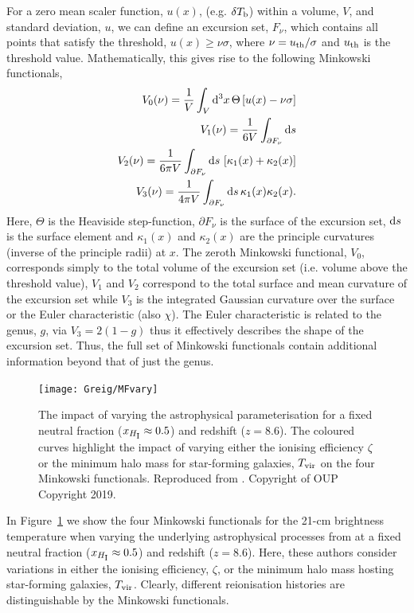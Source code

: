 For a zero mean scaler function, $u(x)$, (e.g. $\delta T_{\rm b}$) within a volume, $V$, and standard deviation, $u$, we can define an excursion set, $F_{\nu}$, which contains all points that satisfy the threshold, $u(x) \geq \nu\sigma$, where $\nu = u_{\rm th}/\sigma$ and $u_{\rm th}$ is the threshold value. Mathematically, this gives rise to the following Minkowski functionals,
\begin{eqnarray}
V_{0}(\nu) = \frac{1}{V}\int_{V} {\rm d^3}x\,\Theta\left[u(x) - \nu \sigma\right] \\
V_{1}(\nu) = \frac{1}{6V}\int_{\partial F_{\nu}} {\rm d}s \\
V_{2}(\nu) = \frac{1}{6\pi V}\int_{\partial F_{\nu}} {\rm d}s\,\left[\kappa_{1}(x) + \kappa_{2}(x)\right] \\
V_{3}(\nu) = \frac{1}{4\pi V}\int_{\partial F_{\nu}} {\rm d}s\, \kappa_{1}(x)\kappa_{2}(x).
\end{eqnarray}
Here, $\Theta$ is the Heaviside step-function, $\partial F_{\nu}$ is the surface of the excursion set, ${\rm d}s$ is the surface element and $\kappa_{1}(x)$ and  $\kappa_{2}(x)$ are the principle curvatures (inverse of the principle radii) at $x$. The zeroth Minkowski functional, $V_{0}$, corresponds simply to the total volume of the excursion set (i.e. volume above the threshold value), $V_{1}$ and $V_{2}$ correspond to the total surface and mean curvature of the excursion set while $V_{3}$ is the integrated Gaussian curvature over the surface or the Euler characteristic (also $\chi$). The Euler characteristic is related to the genus, $g$, via $V_{3} = 2(1-g)$ thus it effectively describes the shape of the excursion set. Thus, the full set of Minkowski functionals contain additional information beyond that of just the genus.

\begin{figure}[]
\begin{center}
\texttt{[image: Greig/MFvary]}
\end{center}
\caption{The impact of varying the astrophysical parameterisation for a fixed neutral fraction ($x_{H_{\rm \scriptstyle I}}\approx 0.5$) and redshift ($z=8.6$). The coloured curves highlight the impact of varying either the ionising efficiency $\zeta$ or the minimum halo mass for star-forming galaxies, $T_{\rm vir}$ on the four Minkowski functionals. Reproduced from \cite{Yoshiura:2017}. Copyright of OUP Copyright 2019.}
\label{fig:MFs}
\end{figure}

In Figure~\ref{fig:MFs} we show the four Minkowski functionals for the 21-cm brightness temperature when varying the underlying astrophysical processes from \cite{Yoshiura:2017} at a fixed neutral fraction ($x_{H_{\rm \scriptstyle I}}\approx 0.5$) and redshift ($z=8.6$). Here, these authors consider variations in either the ionising efficiency, $\zeta$, or the minimum halo mass hosting star-forming galaxies, $T_{\rm vir}$. Clearly, different reionisation histories are distinguishable by the Minkowski functionals.

